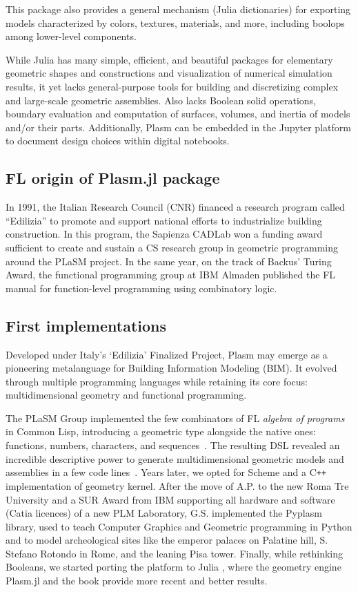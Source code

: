 \documentclass{juliacon}
\begin{document}
This package also provides a general mechanism (Julia dictionaries) for exporting models characterized by colors, textures, materials, and more, including boolops among lower-level components. 

While Julia has many simple, efficient, and beautiful packages for elementary geometric shapes and constructions and visualization of numerical simulation results, it yet lacks general-purpose tools for building and discretizing complex and large-scale geometric assemblies. Also lacks Boolean solid operations, boundary evaluation and computation of surfaces, volumes, and inertia of models and/or their parts. Additionally, Plasm can be embedded in the Jupyter platform to document design choices within digital notebooks.

\subsection{FL origin of Plasm.jl package}
\label{sec:plasm}

In 1991, the Italian Research Council (CNR) financed a research program called “Edilizia” to promote and support national efforts to industrialize building construction. In this program, the Sapienza CADLab won a funding award sufficient to create and sustain a CS research group in geometric programming around the PLaSM project.
In the same year, on the track of Backus’ Turing Award, the functional programming group at IBM Almaden published the FL manual for function-level programming using combinatory logic. 

\subsection{First implementations}
\label{sec:pyplasm}
Developed under Italy's `Edilizia’ Finalized Project, Plasm may emerge as a pioneering metalanguage for Building Information Modeling (BIM). It evolved through multiple programming languages while retaining its core focus: multidimensional geometry and functional programming.

The PLaSM Group implemented the few combinators of FL \emph{algebra of programs} in Common Lisp, introducing a geometric type alongside the native ones: functions, numbers, characters, and sequences~\cite{BWW90,IBM:RJ7100}. The resulting DSL revealed an incredible descriptive power to generate multidimensional geometric models and assemblies in a few code lines~\cite{Paoluzzi2003a}. Years later, we opted for Scheme and a C\texttt{++} implementation of geometry kernel. After the move of A.P. to the new Roma Tre University and a SUR Award from IBM supporting all hardware and software (Catia licences) of a new PLM Laboratory, G.S. implemented the Pyplasm library, used to teach Computer Graphics and Geometric programming in Python and to model archeological sites like the emperor palaces on Palatine hill, S. Stefano Rotondo in Rome, and the leaning Pisa tower. Finally, while rethinking Booleans, we started porting the platform to Julia \cite{BEKS14}, where the geometry engine Plasm.jl and the book \cite{Plasm:book:2005} provide more recent and better results. 
\end{document}
